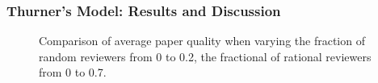 \documentclass{beamer}
\begin{document}
\begin{frame}
\frametitle{Thurner's Model: Results and Discussion}
\begin{figure}
    \begin{center}
    \caption{Comparison of average paper quality when varying the fraction of random reviewers from 0 to 0.2, the fractional of rational reviewers from 0 to 0.7.}
    \end{center}
\end{figure}
\end{frame}
\end{document}

